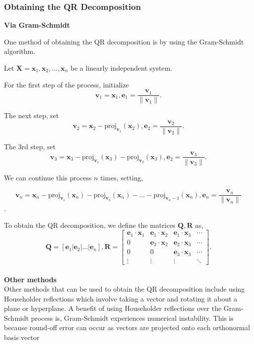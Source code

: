 \documentclass[onecolumn]{webofc}
\begin{document}
\subsubsection*{Obtaining the QR Decomposition}
\textbf{Via Gram-Schmidt}

One method of obtaining the QR decomposition is by using the Gram-Schmidt algorithm. 

Let $\mathbf{X} = \mathbf{x}_1, \mathbf{x}_2, \ldots, \mathbf{x}_n$ be a linearly independent system.

For the first step of the process, initialize $$\mathbf{v}_1= \mathbf{x}_1, \mathbf{e}_1 = \frac{\mathbf{v}_1}{\|\mathbf{v}_1\|}.$$

The next step, set $$\mathbf{v}_2 = \mathbf{x}_2 - \text{proj}_{\mathbf{v}_1}(\mathbf{x}_2), \mathbf{e}_2 = \frac{\mathbf{v}_2}{\|\mathbf{v}_2\|}.$$

The 3rd step, set $$\mathbf{v}_3 = \mathbf{x}_3 - \text{proj}_{\mathbf{v}_1}(\mathbf{x}_3) - \text{proj}_{\mathbf{v}_2}(\mathbf{x}_3), \mathbf{e}_2 = \frac{\mathbf{v}_3}{\|\mathbf{v}_3\|}.$$

We can continue this process $n$ times,  setting,

$$\mathbf{v}_n = \mathbf{x}_n - \text{proj}_{\mathbf{v}_1}(\mathbf{x}_n) - \text{proj}_{\mathbf{v}_2}(\mathbf{x}_n)- \ldots - \text{proj}_{\mathbf{v}_n-1}(\mathbf{x}_n), \mathbf{e}_n = \frac{\mathbf{v}_n}{\|\mathbf{v}_n\|}$$.

To obtain the QR decomposition, we define the matrices $\mathbf{Q}, \mathbf{R}$ as,
$$\mathbf{Q} = [\mathbf{e}_1 | \mathbf{e}_2 | \ldots | \mathbf{e}_n], \mathbf{R} = \begin{bmatrix}
  \mathbf{e}_1 \cdot \mathbf{x}_1 &
  \mathbf{e}_1 \cdot \mathbf{x}_2 &
  \mathbf{e}_1 \cdot \mathbf{x}_3 & \cdots \\
                                         0 &
 \mathbf{e}_2 \cdot \mathbf{x}_2 &
 \mathbf{e}_2 \cdot \mathbf{x}_3& \cdots \\
                                         0 &
                                         0 &
  \mathbf{e}_3 \cdot \mathbf{x}_3& \cdots \\
                                    \vdots &
                                    \vdots &
                                    \vdots &
                                    \ddots\end{bmatrix}.$$
\\
\textbf{Other methods}
\\
Other methods that can be used to obtain the QR decomposition include using Householder reflections which involve taking a vector and rotating it about a plane or hyperplane\cite{RefC}. A benefit of using Householder reflections over the Gram-Schmidt process is, Gram-Schmidt experiences numerical instability. This is because round-off error can occur as vectors are projected onto each orthonormal basis vector 
\end{document}
